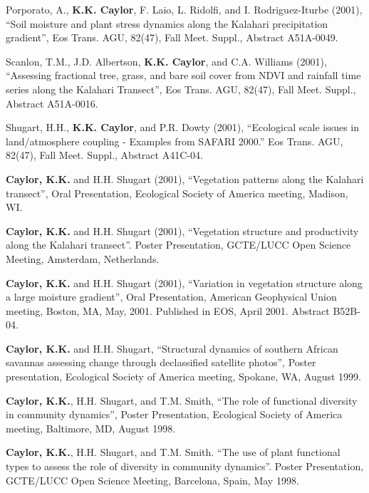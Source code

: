 \documentclass[10pt]{article}
\begin{document}
\begin{etaremune}
\item Porporato, A., \textbf{K.K. Caylor}, F. Laio, L. Ridolfi, and I. Rodriguez-Iturbe (2001), ``Soil moisture and plant stress dynamics along the Kalahari precipitation gradient'', Eos Trans. AGU, 82(47), Fall Meet. Suppl., Abstract A51A-0049.

\item Scanlon, T.M., J.D. Albertson, \textbf{K.K. Caylor}, and C.A. Williams (2001), ``Assessing fractional tree, grass, and bare soil cover from NDVI and rainfall time series along the Kalahari Transect'', Eos Trans. AGU, 82(47), Fall Meet. Suppl., Abstract A51A-0016.

\item Shugart, H.H., \textbf{K.K. Caylor}, and P.R. Dowty (2001), ``Ecological scale issues in land/atmosphere coupling - Examples from SAFARI 2000.'' Eos Trans. AGU, 82(47), Fall Meet. Suppl., Abstract A41C-04.

\item \textbf{Caylor, K.K.} and H.H. Shugart (2001), ``Vegetation patterns along the Kalahari transect'', Oral Presentation, Ecological Society of America meeting, Madison, WI.

\item \textbf{Caylor, K.K.} and H.H. Shugart (2001), ``Vegetation structure and productivity along the Kalahari transect''. Poster Presentation, GCTE/LUCC Open Science Meeting, Amsterdam, Netherlands.

\item \textbf{Caylor, K.K.} and H.H. Shugart (2001), ``Variation in vegetation structure along a large moisture gradient'', Oral Presentation, American Geophysical Union meeting, Boston, MA, May, 2001. Published in EOS, April 2001. Abstract B52B-04.

\item \textbf{Caylor, K.K.} and H.H. Shugart, ``Structural dynamics of southern African savannas assessing change through declassified satellite photos'', Poster presentation, Ecological Society of America meeting, Spokane, WA, August 1999.

\item \textbf{Caylor, K.K.}, H.H. Shugart, and T.M. Smith, ``The role of functional diversity in community dynamics'', Poster Presentation, Ecological Society of America meeting, Baltimore, MD, August 1998.

\item \textbf{Caylor, K.K.}, H.H. Shugart, and T.M. Smith. ``The use of plant functional types to assess the role of diversity in community dynamics''. Poster Presentation, GCTE/LUCC Open Science Meeting, Barcelona, Spain, May 1998.

\end{etaremune}
\end{document}
